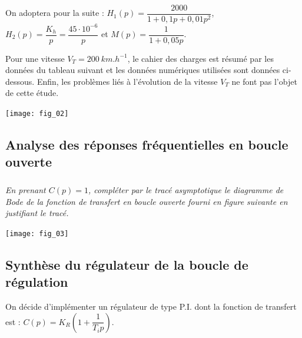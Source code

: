 On adoptera pour la suite : $H_1(p)=\dfrac{2000}{1+0,1p+0,01p^2}$,  $H_2(p)=\dfrac{K_h}{p} = \dfrac{45\cdot 10^{-6}}{p}$ et $M(p)=\dfrac{1}{1+0,05 p}$.

Pour une vitesse $V_T=\SI{200}{km.h^{-1}}$, le cahier des charges est résumé par les données 
du tableau suivant et les données numériques utilisées sont données ci-dessous.
Enfin, les problèmes liés à l’évolution de la vitesse $V_T$ ne font pas l’objet de cette
étude.


\begin{marginfigure}
\texttt{[image: fig\_02]}
\end{marginfigure}


\subsection*{Analyse des réponses fréquentielles en boucle ouverte}


\subparagraph{}
\textit{En prenant $C(p)=1$, compléter par le tracé asymptotique le diagramme
de Bode de la fonction de transfert en boucle ouverte fourni en figure suivante
en justifiant le tracé.}

\begin{marginfigure}
\texttt{[image: fig\_03]}
\end{marginfigure}

\subsection*{Synthèse du régulateur de la boucle de régulation}
On décide d’implémenter un régulateur de type P.I. dont la fonction de transfert
est : $C(p)=K_R\left( 1+\dfrac{1}{T_i p}\right)$.






